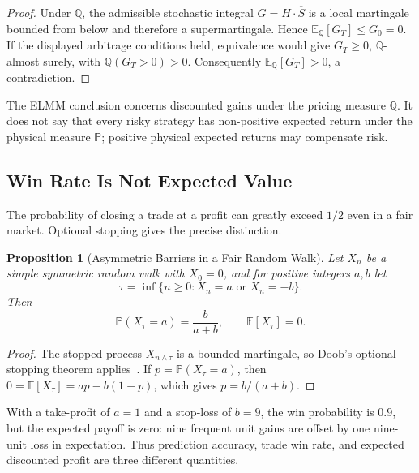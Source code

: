 \documentclass[aps,pra,reprint,superscriptaddress,amsmath,amssymb,floatfix]{revtex4-2}
\theoremstyle{plain}
\newtheorem{proposition}[theorem]{Proposition}
\theoremstyle{definition}
\theoremstyle{remark}
\begin{document}
\begin{proof}
Under \(\mathbb{Q}\), the admissible stochastic integral
\(G=H\mathbin{\cdot}\overline S\) is a local martingale bounded from below and
therefore a supermartingale. Hence
\(\mathbb{E}_{\mathbb{Q}}[G_T]\leq G_0=0\). If the displayed arbitrage
conditions held, equivalence would give \(G_T\geq0\),
\(\mathbb{Q}\)-almost surely, with
\(\mathbb{Q}(G_T>0)>0\). Consequently
\(\mathbb{E}_{\mathbb{Q}}[G_T]>0\), a contradiction.
\end{proof}

The ELMM conclusion concerns discounted gains under the pricing measure
\(\mathbb{Q}\). It does not say that every risky strategy has non-positive
expected return under the physical measure \(\mathbb{P}\); positive physical
expected returns may compensate risk.

\subsection{Win Rate Is Not Expected Value}

The probability of closing a trade at a profit can greatly exceed \(1/2\)
even in a fair market. Optional stopping gives the precise distinction.

\begin{proposition}[Asymmetric Barriers in a Fair Random Walk]
  \label{prop:optional}
  Let \(X_n\) be a simple symmetric random walk with \(X_0=0\), and for positive
  integers \(a,b\) let
  \[
    \tau=\inf\{n\geq0:X_n=a\text{ or }X_n=-b\}.
  \]
  Then
  \begin{equation}
    \mathbb{P}(X_\tau=a)=\frac{b}{a+b},
    \qquad
    \mathbb{E}[X_\tau]=0.
    \label{eq:gambler}
  \end{equation}
\end{proposition}

\begin{proof}
The stopped process \(X_{n\wedge\tau}\) is a bounded martingale, so Doob's
optional-stopping theorem applies~\cite{Doob1953}. If
\(p=\mathbb{P}(X_\tau=a)\), then
\(0=\mathbb{E}[X_\tau]=ap-b(1-p)\), which gives
\(p=b/(a+b)\).
\end{proof}

With a take-profit of \(a=1\) and a stop-loss of \(b=9\), the win probability
is \(0.9\), but the expected payoff is zero: nine frequent unit gains are
offset by one nine-unit loss in expectation. Thus prediction accuracy, trade
win rate, and expected discounted profit are three different quantities.
\end{document}
